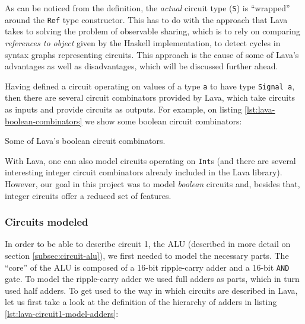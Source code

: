         As can be noticed from the definition, the \emph{actual} circuit type (\texttt{S}) is
        ``wrapped'' around the \texttt{Ref} type constructor. This has to do with the approach that
        Lava takes to solving the problem of observable sharing, which is to rely on comparing
        \emph{references to object} given by the Haskell implementation, to detect cycles in syntax
        graphs representing circuits. This approach is the cause of some of Lava's advantages as
        well as disadvantages, which will be discussed further ahead.

        Having defined a circuit operating on values of a type \texttt{a} to have type
        \texttt{Signal a}, then there are several circuit combinators provided by Lava, which take
        circuits as inputs and provide circuits as outputs. For example, on listing
        \ref{lst:lava-boolean-combinators} we show some boolean circuit combinators:

        \begin{listing}[h!]
            \caption{Some of Lava's boolean circuit combinators.
                \label{lst:lava-boolean-combinators}}
        \end{listing}

        With Lava, one can also model circuits operating on \texttt{Int}s (and there are several
        interesting integer circuit combinators already included in the Lava library). However, our
        goal in this project was to model \emph{boolean} circuits and, besides that, integer
        circuits offer a reduced set of features.


        \subsubsection{Circuits modeled}
        \label{subsubsec:lava-circuits}

            In order to be able to describe circuit 1, the ALU (described in more detail on section
            \ref{subsec:circuit-alu}), we first needed to model the necessary parts. The ``core'' of
            the ALU is composed of a 16-bit ripple-carry adder and a 16-bit \texttt{AND} gate. To
            model the ripple-carry adder we used full adders as parts, which in turn used half
            adders. To get used to the way in which circuits are described in Lava, let us first
            take a look at the definition of the hierarchy of adders in listing
            \ref{lst:lava-circuit1-model-adders}:

